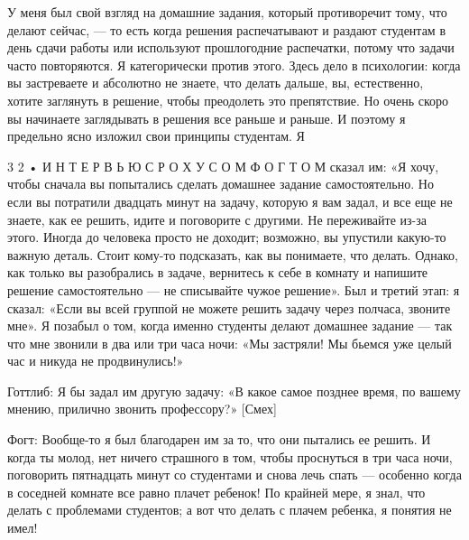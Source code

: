 \documentclass[11pt,oneside]{article}
\begin{document}
У меня был свой взгляд на домашние задания, который противоречит тому, что делают сейчас, --- то есть когда решения распечатывают и раздают студентам в день сдачи работы или используют прошлогодние распечатки, потому что задачи часто повторяются. Я категорически против этого. Здесь дело в психологии: когда вы застреваете и абсолютно не знаете, что делать дальше, вы, естественно, хотите заглянуть в решение, чтобы преодолеть это препятствие. Но очень скоро вы начинаете заглядывать в решения все раньше и раньше. И поэтому я предельно ясно изложил свои принципы студентам. Я\par



3 2 • И Н Т Е Р В Ь Ю  С  Р О Х У С О М  Ф О Г Т О М сказал им: «Я хочу, чтобы сначала вы попытались сделать домашнее задание самостоятельно. Но если вы потратили двадцать минут на задачу, которую я вам задал, и все еще не знаете, как ее решить, идите и поговорите с другими. Не переживайте из-за этого. Иногда до человека просто не доходит; возможно, вы упустили какую-то важную деталь. Стоит кому-то подсказать, как вы понимаете, что делать. Однако, как только вы разобрались в задаче, вернитесь к себе в комнату и напишите решение самостоятельно --- не списывайте чужое решение». Был и третий этап: я сказал: «Если вы всей группой не можете решить задачу через полчаса, звоните мне». Я позабыл о том, когда именно студенты делают домашнее задание --- так что мне звонили в два или три часа ночи: «Мы застряли! Мы бьемся уже целый час и никуда не продвинулись!»\par



Готтлиб: Я бы задал им другую задачу: «В какое самое позднее время, по вашему мнению, прилично звонить профессору?» [Смех]\par



Фогт: Вообще-то я был благодарен им за то, что они пытались ее решить. И когда ты молод, нет ничего страшного в том, чтобы проснуться в три часа ночи, поговорить пятнадцать минут со студентами и снова лечь спать --- особенно когда в соседней комнате все равно плачет ребенок! По крайней мере, я знал, что делать с проблемами студентов; а вот что делать с плачем ребенка, я понятия не имел!\par
\end{document}
